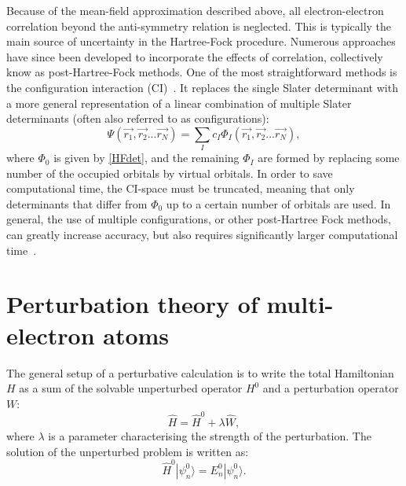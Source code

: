 Because of the mean-field approximation described above, all electron-electron correlation beyond the anti-symmetry relation is neglected. This is typically the main source of uncertainty in the Hartree-Fock procedure. Numerous approaches have since been developed to incorporate the effects of correlation, collectively know as post-Hartree-Fock methods. One of the most straightforward methods is the configuration interaction (CI)~\cite{Tup2003OS}. It replaces the single Slater determinant with a more general representation of a linear combination of multiple Slater determinants (often also referred to as configurations):
\begin{equation}
  \Psi(\vec{r_1}, \vec{r_2} ... \vec{r_N}) = \sum_I c_I \Phi_I(\vec{r_1}, \vec{r_2} ... \vec{r_N}),
\end{equation}
where $\Phi_0$ is given by \eqref{HFdet}, and the remaining $\Phi_I$ are formed by replacing some number of the occupied orbitals by virtual orbitals. In order to save computational time, the CI-space must be truncated, meaning that only determinants that differ from $\Phi_0$ up to a certain number of orbitals are used. In general, the use of multiple configurations, or other post-Hartree Fock methods, can greatly increase accuracy, but also requires significantly larger computational time~\cite{Koppl2016}.

\section{Perturbation theory of multi-electron atoms}

The general setup of a perturbative calculation is to write the total Hamiltonian $H$ as a sum of the solvable unperturbed operator $H^0$ and a perturbation operator $W$:
\begin{equation}
	\widehat{H}=\widehat{H}^0+\lambda \widehat{W},
\end{equation}
where $\lambda$ is a parameter characterising the strength of the perturbation. The solution of the unperturbed problem is written as: 
\begin{equation}
	\widehat{H}^0|\psi^0_n\rangle=E^0_n|\psi^0_n\rangle.
\end{equation}

